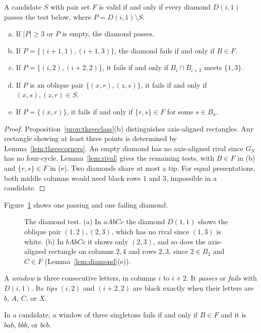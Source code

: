 \begin{lemma}\label{lem:diamond}
A candidate $S$ with pair set $F$ is valid if and only if every diamond $D(i,1)$ passes the
test below, where $P=D(i,1)\setminus S$.
\begin{enumerate}[(a)]
\item If $|P|\ge3$ or $P$ is empty, the diamond passes.
\item If $P=\{(i+1,1),(i+1,3)\}$, the diamond fails if and only if $B\in F$.
\item If $P=\{(i,2),(i+2,2)\}$, it fails if and only if $B_i\cap B_{i+2}$ meets $\{1,3\}$.
\item If $P$ is an oblique pair $\{(x,r),(z,s)\}$, it fails if and only if $(x,s),(z,r)\in S$.
\item If $P=\{(x,r)\}$, it fails if and only if $\{r,s\}\in F$ for some $s\in B_x$.
\end{enumerate}
\end{lemma}

\begin{proof}
Proposition~\ref{prop:threeclass}(b) distinguishes axis-aligned rectangles.
Any rectangle showing at least three points is determined by
Lemma~\ref{lem:threecorners}. An empty diamond has no axis-aligned rival since
$G_S$ has no four-cycle. Lemma~\ref{lem:rival} gives the remaining
tests, with $B\in F$ in (b) and $\{r,s\}\in F$ in (e).
Two diamonds share at most a tip. For equal presentations, both middle
columns would need black rows $1$ and $3$, impossible in a candidate.
\end{proof}

Figure~\ref{fig:diamond} shows one passing and one failing diamond.

\begin{figure}[t]
\centering

\caption{The diamond test. (a) In $aAbCc$ the diamond $D(1,1)$ shows the oblique pair $(1,2),(2,3)$, which has no rival since $(1,3)$ is white. (b) In $bAbCc$ it shows only $(2,3)$, and so does the axis-aligned rectangle on columns $2,4$ and rows $2,3$, since $2\in B_2$ and $C\in F$ (Lemma~\ref{lem:diamond}(e)).}
\label{fig:diamond}
\end{figure}

A \emph{window} is three consecutive letters, in columns $i$ to $i+2$.
It \emph{passes} or \emph{fails} with $D(i,1)$.
Its \emph{tips} $(i,2)$ and $(i+2,2)$ are black exactly when their letters
are $b$, $A$, $C$, or $X$.

\begin{lemma}\label{lem:dichotomy}
In a candidate, a window of three singletons fails if and only if $B\in F$ and it is
$bab$, $bbb$, or $bcb$.
\end{lemma}


